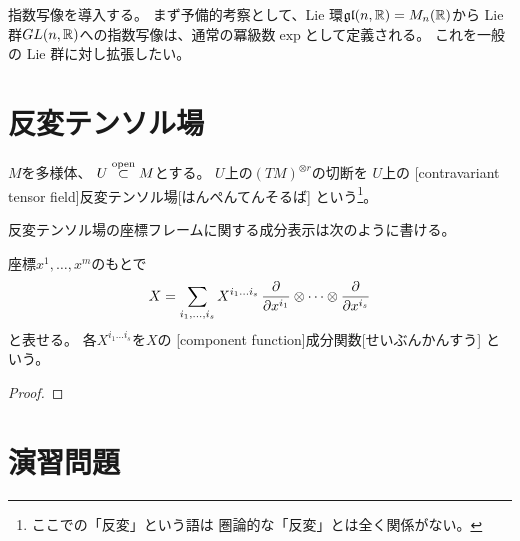 \documentclass[report]{jlreq}
\begin{document}
指数写像を導入する。
まず予備的考察として、Lie 環$\mathfrak{gl}(n, \mathbb{R}) = M_n(\mathbb{R})$から
Lie 群$GL(n, \mathbb{R})$への指数写像は、通常の冪級数$\exp$として定義される。
これを一般の Lie 群に対し拡張したい。

\begin{definition}[指数写像]
    \TODO{}
\end{definition}

%
\section{反変テンソル場}

\begin{definition}[反変テンソル場]
    $M$を多様体、
    $U \stackrel{\text{open}}{\subset} M$とする。
    $U$上の$(TM)^{\otimes r}$の切断を
    $U$上の
    [contravariant tensor field]{反変テンソル場}[はんぺんてんそるば]
    という\footnote{
        ここでの「反変」という語は
        圏論的な「反変」とは全く関係がない。
    }。
\end{definition}

反変テンソル場の座標フレームに関する成分表示は次のように書ける。

\begin{proposition}[反変テンソル場の座標フレームに関する成分表示]
    座標$x^1, \dots, x^m$のもとで
    \begin{equation}
        X = \sum_{i_1, \dots, i_s}
            X^{i_1 \dots i_s} \,
            \deldel{x^{i_1}} \otimes \dots \otimes \deldel{x^{i_s}}
    \end{equation}
    と表せる。
    各$X^{i_1 \dots i_s}$を$X$の
    [component function]{成分関数}[せいぶんかんすう]
    という。
\end{proposition}

\begin{proof}
    \TODO{}
\end{proof}

%
\newpage
\section{演習問題}
\end{document}
